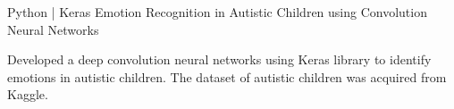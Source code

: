 \begin{cventries}
  \cventry
    {Python | Keras} %
    {Emotion Recognition in Autistic Children using Convolution Neural Networks} %
    {} %
    {} %
    {
      \begin{cvitems} %
        \item {Developed a deep convolution neural networks using Keras library to identify emotions in autistic children. The dataset of autistic children was acquired from Kaggle.}
      \end{cvitems}
    }

\end{cventries}
